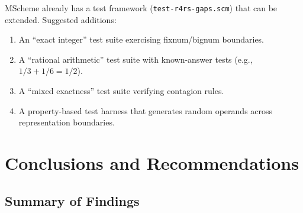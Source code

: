 \documentclass[12pt]{report}
\begin{document}
MScheme already has a test framework ({\tt test-r4rs-gaps.scm}) that
can be extended.  Suggested additions:

\begin{enumerate}
\item An ``exact integer'' test suite exercising fixnum/bignum
  boundaries.
\item A ``rational arithmetic'' test suite with known-answer tests
  (e.g., $1/3 + 1/6 = 1/2$).
\item A ``mixed exactness'' test suite verifying contagion rules.
\item A property-based test harness that generates random operands
  across representation boundaries.
\end{enumerate}

\chapter{Conclusions and Recommendations}
\label{ch:conclusions}

\section{Summary of Findings}
\end{document}
